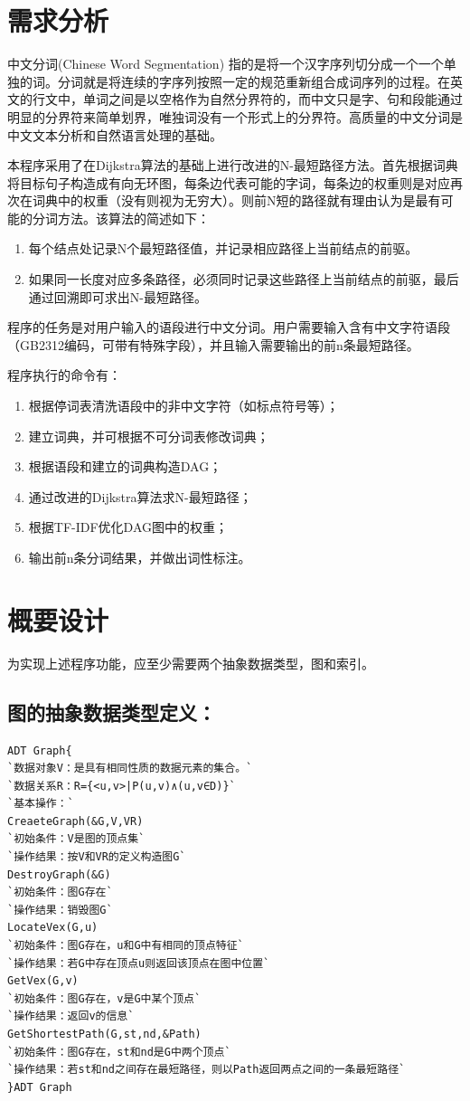 \documentclass[UTF8]{ctexart}
\begin{document}
\section{需求分析}
	中文分词(Chinese Word Segmentation) 指的是将一个汉字序列切分成一个一个单独的词。分词就是将连续的字序列按照一定的规范重新组合成词序列的过程。在英文的行文中，单词之间是以空格作为自然分界符的，而中文只是字、句和段能通过明显的分界符来简单划界，唯独词没有一个形式上的分界符。高质量的中文分词是中文文本分析和自然语言处理的基础。\par
	本程序采用了在Dijkstra算法的基础上进行改进的N-最短路径方法。首先根据词典将目标句子构造成有向无环图，每条边代表可能的字词，每条边的权重则是对应再次在词典中的权重（没有则视为无穷大）。则前N短的路径就有理由认为是最有可能的分词方法。该算法的简述如下：\par
\begin{enumerate}
\item 每个结点处记录N个最短路径值，并记录相应路径上当前结点的前驱。
\item 如果同一长度对应多条路径，必须同时记录这些路径上当前结点的前驱，最后通过回溯即可求出N-最短路径。
\end{enumerate}\par
	程序的任务是对用户输入的语段进行中文分词。用户需要输入含有中文字符语段（GB2312编码，可带有特殊字段），并且输入需要输出的前n条最短路径。\par
	程序执行的命令有：\par
\begin{enumerate}[1)]
\item 根据停词表清洗语段中的非中文字符（如标点符号等）；
\item 建立词典，并可根据不可分词表修改词典；
\item 根据语段和建立的词典构造DAG；
\item 通过改进的Dijkstra算法求N-最短路径；
\item 根据TF-IDF优化DAG图中的权重；
\item 输出前n条分词结果，并做出词性标注。
\end{enumerate}
\newpage
\section{概要设计}
	为实现上述程序功能，应至少需要两个抽象数据类型，图和索引。\par
\subsection{图的抽象数据类型定义：}
\begin{lstlisting}
ADT Graph{
`数据对象V：是具有相同性质的数据元素的集合。`
`数据关系R：R={<u,v>|P(u,v)∧(u,v∈D)}`
`基本操作：`
CreaeteGraph(&G,V,VR)
`初始条件：V是图的顶点集`
`操作结果：按V和VR的定义构造图G`
DestroyGraph(&G)
`初始条件：图G存在`
`操作结果：销毁图G`
LocateVex(G,u)
`初始条件：图G存在，u和G中有相同的顶点特征`
`操作结果：若G中存在顶点u则返回该顶点在图中位置`
GetVex(G,v)
`初始条件：图G存在，v是G中某个顶点`
`操作结果：返回v的信息`
GetShortestPath(G,st,nd,&Path)
`初始条件：图G存在，st和nd是G中两个顶点`
`操作结果：若st和nd之间存在最短路径，则以Path返回两点之间的一条最短路径`
}ADT Graph
\end{lstlisting}
\end{document}
